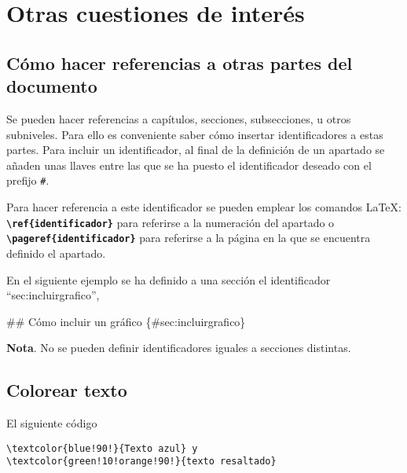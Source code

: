\documentclass[12pt,a4paper,]{book}
\newenvironment{Shaded}{\begin{snugshade}}{\end{snugshade}}
\newcommand{\FunctionTok}[1]{\textcolor[rgb]{0.00,0.00,0.00}{#1}}
\numberwithin{dummy}{section}
\theoremstyle{ocrenumbox}
\theoremstyle{blacknumex}
\theoremstyle{blacknumbox}
\theoremstyle{ocrenum}
\theoremstyle{ocrenum}
\begin{document}
\hypertarget{otras-cuestiones-de-interuxe9s}{%
\section{Otras cuestiones de
interés}\label{otras-cuestiones-de-interuxe9s}}

\hypertarget{cuxf3mo-hacer-referencias-a-otras-partes-del-documento}{%
\subsection{Cómo hacer referencias a otras partes del
documento}\label{cuxf3mo-hacer-referencias-a-otras-partes-del-documento}}

Se pueden hacer referencias a capítulos, secciones, subsecciones, u
otros subniveles. Para ello es conveniente saber cómo insertar
identificadores a estas partes. Para incluir un identificador, al final
de la definición de un apartado se añaden unas llaves entre las que se
ha puesto el identificador deseado con el prefijo \texttt{\#}.

Para hacer referencia a este identificador se pueden emplear los
comandos LaTeX: \textbf{\texttt{\textbackslash{}ref\{identificador\}}}
para referirse a la numeración del apartado o
\textbf{\texttt{\textbackslash{}pageref\{identificador\}}} para
referirse a la página en la que se encuentra definido el apartado.

En el siguiente ejemplo se ha definido a una sección el identificador
``sec:incluirgrafico'',

\begin{Shaded}
\begin{Highlighting}[]
\FunctionTok{\#\# Cómo incluir un gráfico \{\#sec:incluirgrafico\}}
\end{Highlighting}
\end{Shaded}

\textbf{Nota}. No se pueden definir identificadores iguales a secciones
distintas.

\hypertarget{colorear-texto}{%
\subsection{Colorear texto}\label{colorear-texto}}

El siguiente código

\begin{verbatim}
\textcolor{blue!90!}{Texto azul} y 
\textcolor{green!10!orange!90!}{texto resaltado}
\end{verbatim}
\end{document}
